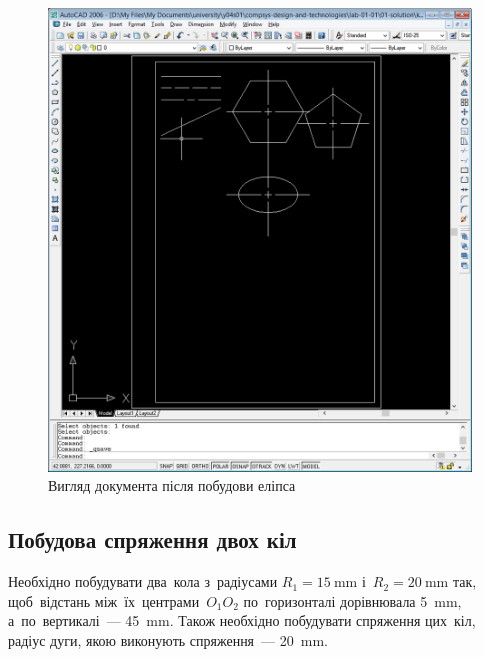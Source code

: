 \documentclass[
	a4paper,
	oneside,
	BCOR = 10mm,
	DIV = 12,
	12pt,
	headings = normal,
]{scrartcl}
\begin{document}
			\begin{figure}[!htbp]
				\centering
				\includegraphics[height=20\baselineskip]{./assets/y04s01-csdt-lab-01-01-p07.png}
				\caption{Вигляд документа після побудови еліпса}
				\label{fig:05-ellipse}
			\end{figure}

		\subsection{Побудова спряження двох кіл}
			Необхідно побудувати два~кола з~радіусами $R_{1} = \SI{15}{\milli\metre}$ і~$R_{2} = \SI{20}{\milli\metre}$ так, щоб~відстань між~їх~центрами~$O_{1}O_{2}$ по~горизонталі дорівнювала \SI{5}{\milli\metre}, а~по~вертикалі~— \SI{45}{\milli\metre}. Також необхідно побудувати спряження цих~кіл, радіус дуги, якою виконують спряження~— \SI{20}{\milli\metre}.
\end{document}
